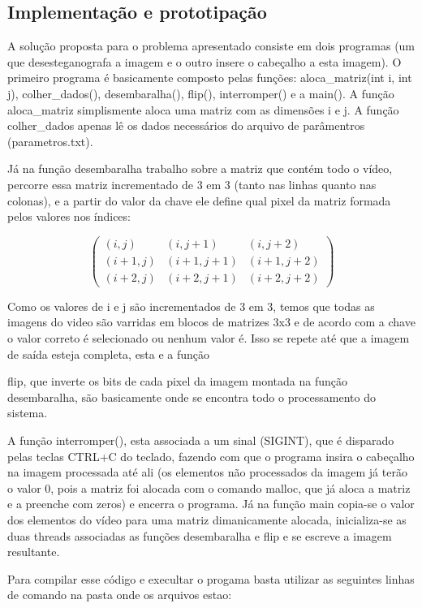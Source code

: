 \documentclass{ieee}
\begin{document}
\subsection{Implementação e prototipação}
A solução proposta para o problema apresentado consiste em dois programas (um que desesteganografa a imagem e o outro insere o cabeçalho
a esta imagem). O primeiro programa é basicamente composto pelas funções: aloca\_matriz(int i, int j), colher\_dados(), desembaralha(), flip(), interromper() e a
main(). A função aloca\_matriz simplismente aloca uma matriz com as dimensões i e j. A função colher\_dados apenas lê os dados necessários
do arquivo de parâmentros (parametros.txt).

Já na função desembaralha trabalho sobre a matriz que contém todo o vídeo, percorre essa matriz 
incrementado de 3 em 3 (tanto nas linhas quanto nas colonas), e a partir do valor da chave ele define qual pixel da matriz formada pelos 
valores nos índices:

\[ \left( \begin{array}{ccc}
(i,j) & (i,j+1) & (i,j+2) \\
(i+1,j) & (i+1,j+1) & (i+1,j+2) \\
(i+2,j) & (i+2,j+1) & (i+2,j+2) \end{array} \right)\] 

Como os valores de i e j são incrementados de 3 em 3, temos que todas as imagens do video são varridas em blocos de matrizes 3x3 e de acordo
com a chave o valor correto é selecionado ou nenhum valor é. Isso se repete até que a imagem de saída esteja completa, esta e a função 

flip, que inverte os bits de cada pixel da imagem montada na função desembaralha, são basicamente onde se encontra todo o processamento 
do sistema.

A função interromper(), esta associada a um sinal (SIGINT), que é disparado pelas teclas CTRL+C do teclado, fazendo com que o programa
insira o cabeçalho na imagem processada até ali (os elementos não processados da imagem já terão o valor 0, pois a matriz foi alocada com
o comando malloc, que já aloca a matriz e a preenche com zeros) e encerra o programa. Já na função main copia-se o valor dos elementos do vídeo 
para uma matriz dimanicamente alocada, inicializa-se as duas threads associadas as funções desembaralha e flip e se escreve a imagem resultante.		

Para compilar esse código e execultar o progama basta utilizar as seguintes linhas de comando na pasta onde os arquivos estao:
\end{document}

